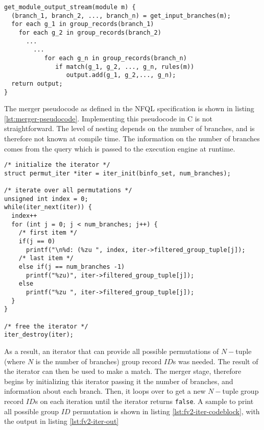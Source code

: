 \begin{lstlisting}
get_module_output_stream(module m) {
  (branch_1, branch_2, ..., branch_n) = get_input_branches(m);
  for each g_1 in group_records(branch_1)
    for each g_2 in group_records(branch_2)
      ...
        ...
           for each g_n in group_records(branch_n)
              if match(g_1, g_2, ..., g_n, rules(m))
                 output.add(g_1, g_2,..., g_n);
  return output;
}
\end{lstlisting}

The merger pseudocode as defined in the \ac{NFQL} specification
\cite{vmarinov:2009} is shown in listing \ref{lst:merger-pseudocode}.
Implementing this pseudocode in C is not straightforward. The level of nesting
depends on the number of branches, and is therefore not known at compile time.
The information on the number of branches comes from the query which is passed
to the execution engine at runtime.

\begin{lstlisting}
/* initialize the iterator */
struct permut_iter *iter = iter_init(binfo_set, num_branches);

/* iterate over all permutations */
unsigned int index = 0;
while(iter_next(iter)) {
  index++
  for (int j = 0; j < num_branches; j++) {
    /* first item */
    if(j == 0)
      printf("\n%d: (%zu ", index, iter->filtered_group_tuple[j]);
    /* last item */
    else if(j == num_branches -1)
      printf("%zu)", iter->filtered_group_tuple[j]);
    else
      printf("%zu ", iter->filtered_group_tuple[j]);
  }
}

/* free the iterator */
iter_destroy(iter);
\end{lstlisting}

As a result, an iterator that can provide all possible permutations of
$N-$tuple (where $N$ is the number of branches) group record $ID$s was needed.
The result of the iterator can then be used to make a match. The merger stage,
therefore begins by initializing this iterator passing  it the number of branches, and information about each
branch. Then, it loops over to get a new $N-$tuple group record $ID$s on each
iteration until the iterator returns \texttt{false}. A sample to print all
possible group $ID$ permutation is shown in listing
\ref{lst:fv2-iter-codeblock}, with the output in listing
\ref{lst:fv2-iter-out}

